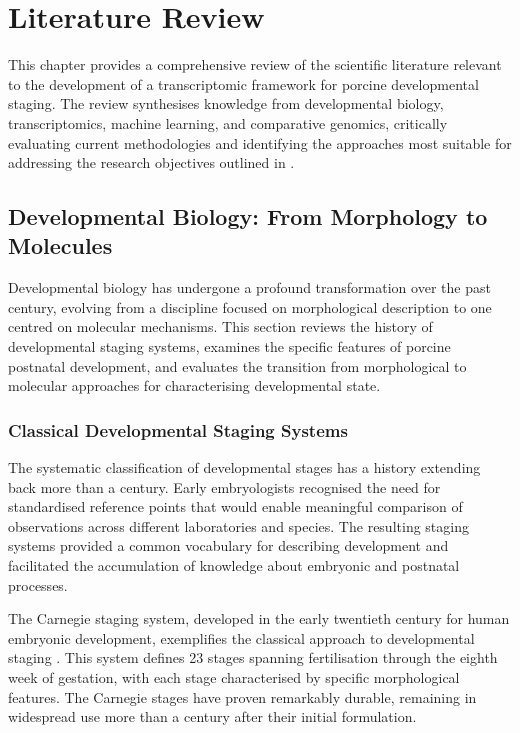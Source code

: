 \chapter{Literature Review}\label{chapter:literature}

\clearpage
\FloatBarrier

This chapter provides a comprehensive review of the scientific literature relevant to the development of a transcriptomic framework for porcine developmental staging. The review synthesises knowledge from developmental biology, transcriptomics, machine learning, and comparative genomics, critically evaluating current methodologies and identifying the approaches most suitable for addressing the research objectives outlined in .


\section{Developmental Biology: From Morphology to Molecules}\label{sec:lit:devbio}

Developmental biology has undergone a profound transformation over the past century, evolving from a discipline focused on morphological description to one centred on molecular mechanisms. This section reviews the history of developmental staging systems, examines the specific features of porcine postnatal development, and evaluates the transition from morphological to molecular approaches for characterising developmental state.

\subsection{Classical Developmental Staging Systems}

The systematic classification of developmental stages has a history extending back more than a century. Early embryologists recognised the need for standardised reference points that would enable meaningful comparison of observations across different laboratories and species. The resulting staging systems provided a common vocabulary for describing development and facilitated the accumulation of knowledge about embryonic and postnatal processes.

The Carnegie staging system, developed in the early twentieth century for human embryonic development, exemplifies the classical approach to developmental staging \parencite{orahilly_developmental_2010}. This system defines 23 stages spanning fertilisation through the eighth week of gestation, with each stage characterised by specific morphological features. The Carnegie stages have proven remarkably durable, remaining in widespread use more than a century after their initial formulation.

